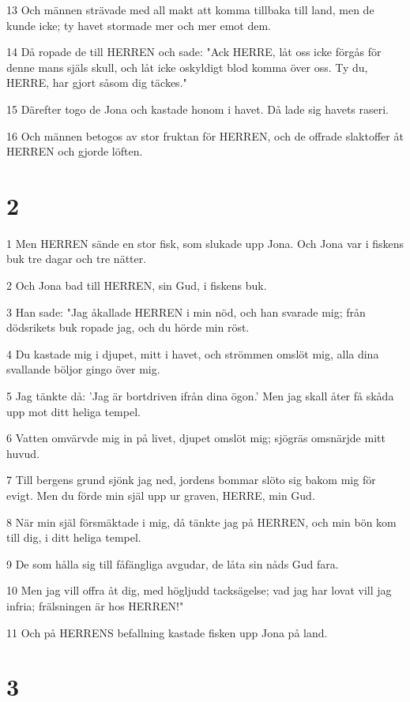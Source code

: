\par 13 Och männen strävade med all makt att komma tillbaka till land, men de kunde icke; ty havet stormade mer och mer emot dem.
\par 14 Då ropade de till HERREN och sade: "Ack HERRE, låt oss icke förgås för denne mans själs skull, och låt icke oskyldigt blod komma över oss. Ty du, HERRE, har gjort såsom dig täckes."
\par 15 Därefter togo de Jona och kastade honom i havet. Då lade sig havets raseri.
\par 16 Och männen betogos av stor fruktan för HERREN, och de offrade slaktoffer åt HERREN och gjorde löften.

\chapter{2}

\par 1 Men HERREN sände en stor fisk, som slukade upp Jona. Och Jona var i fiskens buk tre dagar och tre nätter.
\par 2 Och Jona bad till HERREN, sin Gud, i fiskens buk.
\par 3 Han sade: "Jag åkallade HERREN i min nöd, och han svarade mig; från dödsrikets buk ropade jag, och du hörde min röst.
\par 4 Du kastade mig i djupet, mitt i havet, och strömmen omslöt mig, alla dina svallande böljor gingo över mig.
\par 5 Jag tänkte då: 'Jag är bortdriven ifrån dina ögon.' Men jag skall åter få skåda upp mot ditt heliga tempel.
\par 6 Vatten omvärvde mig in på livet, djupet omslöt mig; sjögräs omsnärjde mitt huvud.
\par 7 Till bergens grund sjönk jag ned, jordens bommar slöto sig bakom mig för evigt. Men du förde min själ upp ur graven, HERRE, min Gud.
\par 8 När min själ försmäktade i mig, då tänkte jag på HERREN, och min bön kom till dig, i ditt heliga tempel.
\par 9 De som hålla sig till fåfängliga avgudar, de låta sin nåds Gud fara.
\par 10 Men jag vill offra åt dig, med högljudd tacksägelse; vad jag har lovat vill jag infria; frälsningen är hos HERREN!"
\par 11 Och på HERRENS befallning kastade fisken upp Jona på land.

\chapter{3}

